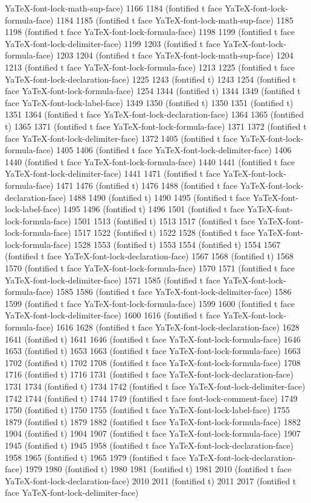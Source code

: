 YaTeX-font-lock-math-sup-face) 1166 1184 (fontified t face YaTeX-font-lock-formula-face) 1184 1185 (fontified t face YaTeX-font-lock-math-sup-face) 1185 1198 (fontified t face YaTeX-font-lock-formula-face) 1198 1199 (fontified t face YaTeX-font-lock-delimiter-face) 1199 1203 (fontified t face YaTeX-font-lock-formula-face) 1203 1204 (fontified t face YaTeX-font-lock-math-sup-face) 1204 1213 (fontified t face YaTeX-font-lock-formula-face) 1213 1225 (fontified t face YaTeX-font-lock-declaration-face) 1225 1243 (fontified t) 1243 1254 (fontified t face YaTeX-font-lock-formula-face) 1254 1344 (fontified t) 1344 1349 (fontified t face YaTeX-font-lock-label-face) 1349 1350 (fontified t) 1350 1351 (fontified t) 1351 1364 (fontified t face YaTeX-font-lock-declaration-face) 1364 1365 (fontified t) 1365 1371 (fontified t face YaTeX-font-lock-formula-face) 1371 1372 (fontified t face YaTeX-font-lock-delimiter-face) 1372 1405 (fontified t face YaTeX-font-lock-formula-face) 1405 1406 (fontified t face YaTeX-font-lock-delimiter-face) 1406 1440 (fontified t face YaTeX-font-lock-formula-face) 1440 1441 (fontified t face YaTeX-font-lock-delimiter-face) 1441 1471 (fontified t face YaTeX-font-lock-formula-face) 1471 1476 (fontified t) 1476 1488 (fontified t face YaTeX-font-lock-declaration-face) 1488 1490 (fontified t) 1490 1495 (fontified t face YaTeX-font-lock-label-face) 1495 1496 (fontified t) 1496 1501 (fontified t face YaTeX-font-lock-formula-face) 1501 1513 (fontified t) 1513 1517 (fontified t face YaTeX-font-lock-formula-face) 1517 1522 (fontified t) 1522 1528 (fontified t face YaTeX-font-lock-formula-face) 1528 1553 (fontified t) 1553 1554 (fontified t) 1554 1567 (fontified t face YaTeX-font-lock-declaration-face) 1567 1568 (fontified t) 1568 1570 (fontified t face YaTeX-font-lock-formula-face) 1570 1571 (fontified t face YaTeX-font-lock-delimiter-face) 1571 1585 (fontified t face YaTeX-font-lock-formula-face) 1585 1586 (fontified t face YaTeX-font-lock-delimiter-face) 1586 1599 (fontified t face YaTeX-font-lock-formula-face) 1599 1600 (fontified t face YaTeX-font-lock-delimiter-face) 1600 1616 (fontified t face YaTeX-font-lock-formula-face) 1616 1628 (fontified t face YaTeX-font-lock-declaration-face) 1628 1641 (fontified t) 1641 1646 (fontified t face YaTeX-font-lock-formula-face) 1646 1653 (fontified t) 1653 1663 (fontified t face YaTeX-font-lock-formula-face) 1663 1702 (fontified t) 1702 1708 (fontified t face YaTeX-font-lock-formula-face) 1708 1716 (fontified t) 1716 1731 (fontified t face YaTeX-font-lock-declaration-face) 1731 1734 (fontified t) 1734 1742 (fontified t face YaTeX-font-lock-delimiter-face) 1742 1744 (fontified t) 1744 1749 (fontified t face font-lock-comment-face) 1749 1750 (fontified t) 1750 1755 (fontified t face YaTeX-font-lock-label-face) 1755 1879 (fontified t) 1879 1882 (fontified t face YaTeX-font-lock-formula-face) 1882 1904 (fontified t) 1904 1907 (fontified t face YaTeX-font-lock-formula-face) 1907 1945 (fontified t) 1945 1958 (fontified t face YaTeX-font-lock-declaration-face) 1958 1965 (fontified t) 1965 1979 (fontified t face YaTeX-font-lock-declaration-face) 1979 1980 (fontified t) 1980 1981 (fontified t) 1981 2010 (fontified t face YaTeX-font-lock-declaration-face) 2010 2011 (fontified t) 2011 2017 (fontified t face YaTeX-font-lock-delimiter-face) 